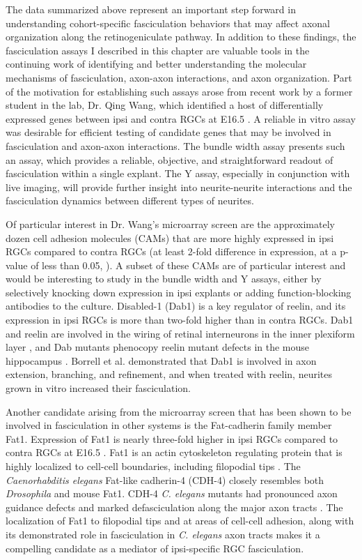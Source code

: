 \label{sec:InVitroFuture}
The data summarized above represent an important step forward in understanding cohort-specific fasciculation behaviors that may affect axonal organization along the retinogeniculate pathway.
In addition to these findings, the fasciculation assays I described in this chapter are valuable tools in the continuing work of identifying and better understanding the molecular mechanisms of fasciculation, axon-axon interactions, and axon organization.
Part of the motivation for establishing such assays arose from recent work by a former student in the lab, Dr. Qing Wang, which identified a host of differentially expressed genes between ipsi and contra RGCs at E16.5 \cite{wang2016ipsilateral}.
A reliable in vitro assay was desirable for efficient testing of candidate genes that may be involved in fasciculation and axon-axon interactions.
The bundle width assay presents such an assay, which provides a reliable, objective, and straightforward readout of fasciculation within a single explant.
The Y assay, especially in conjunction with live imaging, will provide further insight into neurite-neurite interactions and the fasciculation dynamics between different types of neurites.

Of particular interest in Dr. Wang's microarray screen are the approximately dozen cell adhesion molecules (CAMs) that are more highly expressed in ipsi RGCs compared to contra RGCs (at least 2-fold difference in expression, at a p-value of less than 0.05, ).
A subset of these CAMs are of particular interest and would be interesting to study in the bundle width and Y assays, either by selectively knocking down expression in ipsi explants or adding function-blocking antibodies to the culture.
Disabled-1 (Dab1) is a key regulator of reelin, and its expression in ipsi RGCs is more than two-fold higher than in contra RGCs.
Dab1 and reelin are involved in the wiring of retinal interneurons in the inner plexiform layer \cite{rice2001reelin}, and Dab mutants phenocopy reelin mutant defects in the mouse hippocampus \cite{borrell2007reelin}.
Borrell et al.  demonstrated that Dab1 is involved in axon extension, branching, and refinement, and when treated with reelin, neurites grown in vitro increased their fasciculation.

Another candidate arising from the microarray screen that has been shown to be involved in fasciculation in other systems is the Fat-cadherin family member Fat1.
Expression of Fat1 is nearly three-fold higher in ipsi RGCs compared to contra RGCs at E16.5 \cite{wang2016ipsilateral}.
Fat1 is an actin cytoskeleton regulating protein that is highly localized to cell-cell boundaries, including filopodial tips \cite{tanoue2004mammalian}.
The \emph{Caenorhabditis elegans} Fat-like cadherin-4 (CDH-4) closely resembles both \emph{Drosophila} and mouse Fat1.
CDH-4 \emph{C. elegans} mutants had pronounced axon guidance defects and marked defasciculation along the major axon tracts \cite{schmitz2008fat}.
The localization of Fat1 to filopodial tips and at areas of cell-cell adhesion, along with its demonstrated role in fasciculation in \emph{C. elegans} axon tracts makes it a compelling candidate as a mediator of ipsi-specific RGC fasciculation.

